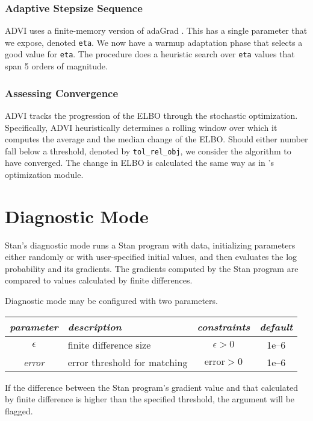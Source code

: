 \subsection{Adaptive Stepsize Sequence}

ADVI uses a finite-memory version of adaGrad \citep{Duchi:2011}. This has a
single parameter that we expose, denoted \texttt{eta}. We now have a warmup
adaptation phase that selects a good value for \texttt{eta}. The
procedure does a heuristic search over \texttt{eta} values that span 5
orders of magnitude.

\subsection{Assessing Convergence}

ADVI tracks the progression of the ELBO through the stochastic optimization.
Specifically, ADVI heuristically determines a rolling window over which it
computes the average and the median change of the ELBO. Should either number
fall below a threshold, denoted by \texttt{tol\_rel\_obj}, we consider the
algorithm to have converged. The change in ELBO is calculated the same way as in
\Stan's optimization module.



\chapter{Diagnostic Mode}\label{diagnostic-algorithms.chapter}

\noindent
Stan's diagnostic mode runs a Stan program with data, initializing
parameters either randomly or with user-specified initial values, and
then evaluates the log probability and its gradients. The gradients
computed by the Stan program are compared to values calculated by
finite differences.

Diagnostic mode may be configured with two parameters.
%
\begin{center}
\begin{tabular}{c|lcc}
{\it parameter} & {\it description} & {\it constraints} & {\it
  default}
\\ \hline
{\it $\epsilon$} & finite difference size & $\epsilon > 0$ & 1e--6
\\
{\it error} & error threshold for matching & $\mbox{error} > 0$ & 1e--6
\end{tabular}
\end{center}
%
If the difference between the Stan program's gradient value and that
calculated by finite difference is higher than the specified
threshold, the argument will be flagged.

